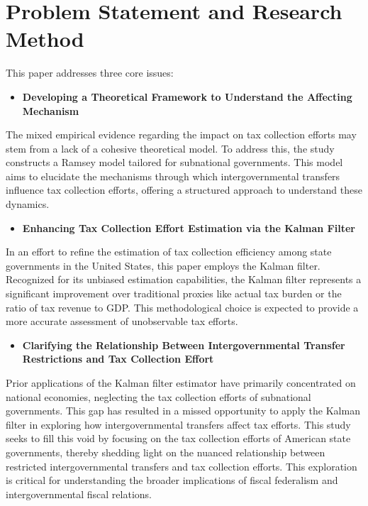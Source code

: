 \section{Problem Statement and Research Method}

This paper addresses three core issues:


\begin{itemize}
    \item \textbf{Developing a Theoretical Framework to Understand the Affecting Mechanism }
\end{itemize}

The mixed empirical evidence regarding the impact on tax collection efforts may stem from a lack of a cohesive theoretical model. To address this, the study constructs a Ramsey model tailored for subnational governments. This model aims to elucidate the mechanisms through which intergovernmental transfers influence tax collection efforts, offering a structured approach to understand these dynamics.

\begin{itemize}
    \item \textbf{Enhancing Tax Collection Effort Estimation via the Kalman Filter}
\end{itemize}

In an effort to refine the estimation of tax collection efficiency among state governments in the United States, this paper employs the Kalman filter. Recognized for its unbiased estimation capabilities, the Kalman filter represents a significant improvement over traditional proxies like actual tax burden or the ratio of tax revenue to GDP. This methodological choice is expected to provide a more accurate assessment of unobservable tax efforts.

\begin{itemize}
    \item \textbf{Clarifying the Relationship Between Intergovernmental Transfer Restrictions and Tax Collection Effort}
\end{itemize}

Prior applications of the Kalman filter estimator have primarily concentrated on national economies, neglecting the tax collection efforts of subnational governments. This gap has resulted in a missed opportunity to apply the Kalman filter in exploring how intergovernmental transfers affect tax efforts. This study seeks to fill this void by focusing on the tax collection efforts of American state governments, thereby shedding light on the nuanced relationship between restricted intergovernmental transfers and tax collection efforts. This exploration is critical for understanding the broader implications of fiscal federalism and intergovernmental fiscal relations.


